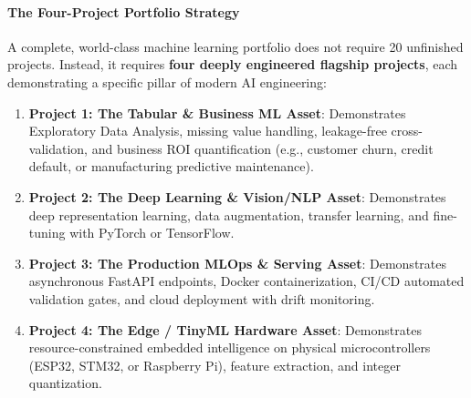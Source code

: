 \paragraph{The Four-Project Portfolio Strategy}
A complete, world-class machine learning portfolio does not require 20 unfinished projects. Instead, it requires \textbf{four deeply engineered flagship projects}, each demonstrating a specific pillar of modern AI engineering:
\begin{enumerate}
    \item \textbf{Project 1: The Tabular \& Business ML Asset}: Demonstrates Exploratory Data Analysis, missing value handling, leakage-free cross-validation, and business ROI quantification (e.g., customer churn, credit default, or manufacturing predictive maintenance).
    \item \textbf{Project 2: The Deep Learning \& Vision/NLP Asset}: Demonstrates deep representation learning, data augmentation, transfer learning, and fine-tuning with PyTorch or TensorFlow.
    \item \textbf{Project 3: The Production MLOps \& Serving Asset}: Demonstrates asynchronous FastAPI endpoints, Docker containerization, CI/CD automated validation gates, and cloud deployment with drift monitoring.
    \item \textbf{Project 4: The Edge / TinyML Hardware Asset}: Demonstrates resource-constrained embedded intelligence on physical microcontrollers (ESP32, STM32, or Raspberry Pi), feature extraction, and integer quantization.
\end{enumerate}

